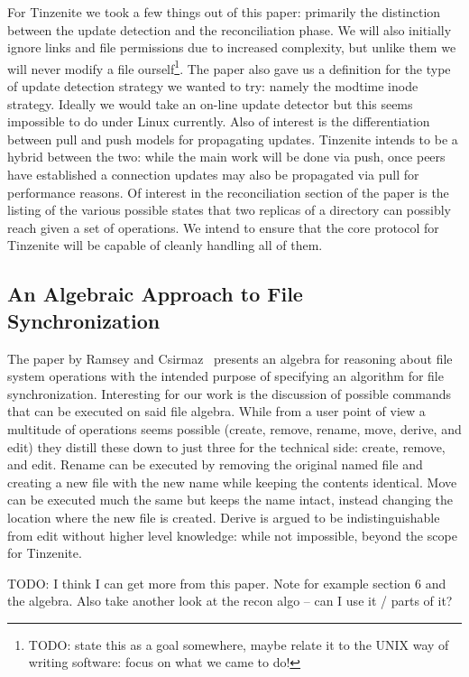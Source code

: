 For Tinzenite we took a few things out of this paper: primarily the distinction between the update detection and the reconciliation phase.
We will also initially ignore links and file permissions due to increased complexity, but unlike them we will never modify a file ourself\footnote{TODO: state this as a goal somewhere, maybe relate it to the UNIX way of writing software: focus on what we came to do!}.
The paper also gave us a definition for the type of update detection strategy we wanted to try: namely the modtime inode strategy.
Ideally we would take an on-line update detector but this seems impossible to do under Linux currently.
Also of interest is the differentiation between pull and push models for propagating updates.
Tinzenite intends to be a hybrid between the two: while the main work will be done via push, once peers have established a connection updates may also be propagated via pull for performance reasons.
Of interest in the reconciliation section of the paper is the listing of the various possible states that two replicas of a directory can possibly reach given a set of operations.
We intend to ensure that the core protocol for Tinzenite will be capable of cleanly handling all of them.

\subsection{An Algebraic Approach to File Synchronization}
\label{sub:An Algebraic Approach to File Synchronization}

The paper by Ramsey and Csirmaz~\cite{ramsey2001algebraic} presents an algebra for reasoning about file system operations with the intended purpose of specifying an algorithm for file synchronization.
Interesting for our work is the discussion of possible commands that can be executed on said file algebra.
While from a user point of view a multitude of operations seems possible (create, remove, rename, move, derive, and edit) they distill these down to just three for the technical side: create, remove, and edit.
Rename can be executed by removing the original named file and creating a new file with the new name while keeping the contents identical.
Move can be executed much the same but keeps the name intact, instead changing the location where the new file is created.
Derive is argued to be indistinguishable from edit without higher level knowledge: while not impossible, beyond the scope for Tinzenite.

TODO: I think I can get more from this paper.
Note for example section 6 and the algebra.
Also take another look at the recon algo – can I use it / parts of it?

